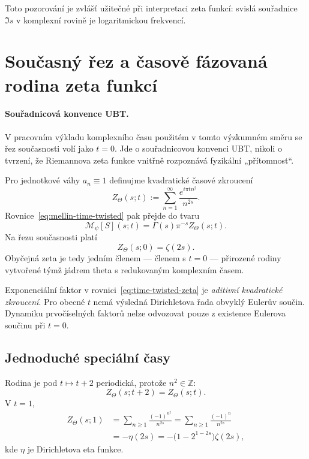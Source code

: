 Toto pozorování je zvlášť užitečné při interpretaci zeta funkcí: svislá
souřadnice $\Im s$ v komplexní rovině je logaritmickou frekvencí.

\section{Současný řez a časově fázovaná rodina zeta funkcí}
\label{sec:time-twisted-zeta}

\paragraph{Souřadnicová konvence UBT.}
V pracovním výkladu komplexního času použitém v tomto výzkumném směru se řez
současnosti volí jako $t=0$. Jde o souřadnicovou konvenci UBT, nikoli o tvrzení,
že Riemannova zeta funkce vnitřně rozpoznává fyzikální „přítomnost“.

Pro jednotkové váhy $a_n\equiv1$ definujme kvadratické časové zkroucení
\begin{equation}
  Z_\Theta(s;t)
  :=\sum_{n=1}^{\infty}
    \frac{e^{i\pi t n^2}}{n^{2s}}.
  \label{eq:time-twisted-zeta}
\end{equation}
Rovnice~\eqref{eq:mellin-time-twisted} pak přejde do tvaru
\begin{equation}
 \boxed{
  \mathcal M_\psi[S](s;t)
  =\Gamma(s)\pi^{-s}Z_\Theta(s;t).}
 \label{eq:mellin-Ztheta}
\end{equation}
Na řezu současnosti platí
\begin{equation}
 \boxed{Z_\Theta(s;0)=\zeta(2s).}
 \label{eq:present-zeta}
\end{equation}
Obyčejná zeta je tedy jedním členem --- členem s $t=0$ --- přirozené rodiny
vytvořené týmž jádrem theta s redukovaným komplexním časem.

\begin{remark}
Exponenciální faktor v rovnici~\eqref{eq:time-twisted-zeta} je \emph{aditivní
kvadratické zkroucení}. Pro obecné $t$ nemá výsledná Dirichletova řada obvyklý
Eulerův součin. Dynamiku prvočíselných faktorů nelze odvozovat pouze z existence
Eulerova součinu při $t=0$.
\end{remark}

\subsection{Jednoduché speciální časy}

Rodina je pod $t\mapsto t+2$ periodická, protože $n^2\in\mathbb Z$:
\begin{equation}
 Z_\Theta(s;t+2)=Z_\Theta(s;t).
\end{equation}
V $t=1$,
\begin{align}
 Z_\Theta(s;1)
 &=\sum_{n\ge1}\frac{(-1)^{n^2}}{n^{2s}}
 =\sum_{n\ge1}\frac{(-1)^n}{n^{2s}}\\
 &=-\eta(2s)
 =-\bigl(1-2^{1-2s}\bigr)\zeta(2s),
 \label{eq:t1-eta}
\end{align}
kde $\eta$ je Dirichletova eta funkce.

